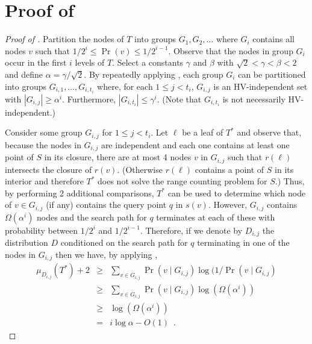\documentclass[charterfonts]{patmorin}
\begin{document}



\appendix
\section{Proof of }

\begin{proof}[Proof of ]
Partition the nodes of $T$ into groups $G_1,G_2,\ldots$ where $G_i$
contains all nodes $v$ such that $1/2^{i} \le \Pr(v) \le 1/2^{i-1}$.
Observe that the nodes in group $G_i$ occur in the first $i$ levels of
$T$.  Select a constants $\gamma$ and $\beta$ with $\sqrt{2} < \gamma
< \beta < 2$ and define $\alpha=\gamma/\sqrt{2}$.  By
repeatedly applying , each group $G_i$ can be
partitioned into groups $G_{i,1},\ldots,G_{i,t_i}$ where, for each $1
\le j < t_i$, $G_{i,j}$ is an HV-independent set with $|G_{i,j}|
\ge \alpha^i$.  Furthermore, $|G_{i,t_i}| \le \gamma^i$. (Note that
$G_{i,t_i}$ is not necessarily HV-independent.)

Consider some group $G_{i,j}$ for $1\le j < t_i$.  Let $\ell$ be a
leaf of $T^*$ and observe that, because the nodes in $G_{i,j}$ are
independent and each one contains at least one point of $S$ in its
closure, there are at most 4 nodes $v$ in $G_{i,j}$ such that
$r(\ell)$ intersects the closure of $r(v)$.  (Otherwise $r(\ell)$
contains a point of $S$ in its interior and therefore $T^*$ does not
solve the range counting problem for $S$.) Thus, by performing 2 
additional comparisons, $T^*$ can be used to determine which node of
$v\in G_{i,j}$ (if any) contains the query point $q$ in $s(v)$.
However, $G_{i,j}$ contains $\Omega(\alpha^i)$ nodes and the search
path for $q$ terminates at each of these with probability between
$1/2^i$ and $1/2^{i-1}$.  Therefore, if we denote by $D_{i,j}$ the
distribution $D$ conditioned on the search path for $q$ terminating in
one of the nodes in $G_{i,j}$ then we have, by applying
,
\begin{eqnarray*}
   \mu_{D_{i,j}}(T^*) + 2 
    & \ge & \sum_{v\in G_{i,j}}\Pr(v\mid G_{i,j})\log(1/\Pr(v\mid G_{i,j}) \\
    & \ge & \sum_{v\in G_{i,j}}\Pr(v\mid G_{i,j})\log(\Omega(\alpha^i)) \\
    & \ge & \log(\Omega(\alpha^i)) \\
    & = & i\log\alpha - O(1) \enspace .
\end{eqnarray*}


\end{proof}
\end{document}
